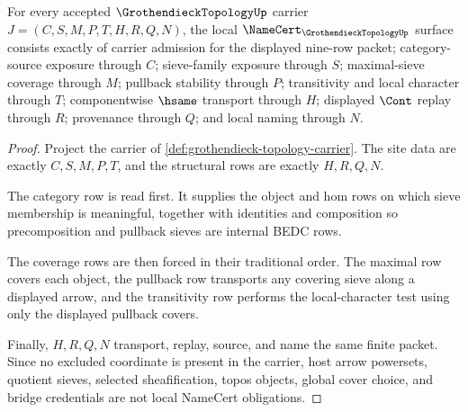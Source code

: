 \begin{theorem}
\label{thm:grothendieck-topology-namecert-obligations}
For every accepted $\GrothendieckTopologyUp$ carrier $J=(C,S,M,P,T,H,R,Q,N)$, the local $\NameCert_{\GrothendieckTopologyUp}$ surface consists exactly of carrier admission for the displayed nine-row packet; category-source exposure through $C$; sieve-family exposure through $S$; maximal-sieve coverage through $M$; pullback stability through $P$; transitivity and local character through $T$; componentwise $\hsame$ transport through $H$; displayed $\Cont$ replay through $R$; provenance through $Q$; and local naming through $N$.
\end{theorem}
\begin{proof}
Project the carrier of \autoref{def:grothendieck-topology-carrier}. The site data are exactly $C,S,M,P,T$, and the structural rows are exactly $H,R,Q,N$.

The category row is read first. It supplies the object and hom rows on which sieve membership is meaningful, together with identities and composition so precomposition and pullback sieves are internal BEDC rows.

The coverage rows are then forced in their traditional order. The maximal row covers each object, the pullback row transports any covering sieve along a displayed arrow, and the transitivity row performs the local-character test using only the displayed pullback covers.

Finally, $H,R,Q,N$ transport, replay, source, and name the same finite packet. Since no excluded coordinate is present in the carrier, host arrow powersets, quotient sieves, selected sheafification, topos objects, global cover choice, and bridge credentials are not local NameCert obligations.
\end{proof}

